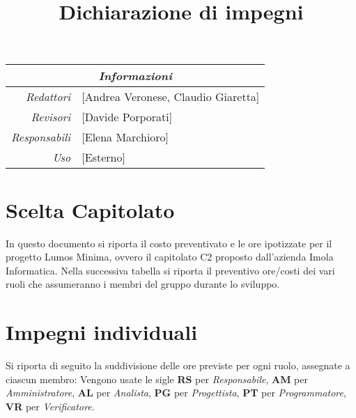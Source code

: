 \documentclass[12pt]{article}
\begin{document}
\graphicspath{ {../../templates/img/} }


\title{Dichiarazione di impegni}
\firstPage

\maketitle

\begin{center}
    \begin{tabular}{r | l}
		\multicolumn{2}{c}{\textit{Informazioni}}\\
		\hline
		
			\textit{Redattori} &
			[Andrea Veronese, Claudio Giaretta]\makecell{}\\

			\textit{Revisori} &
			[Davide Porporati]\makecell{}\\
			\textit{Responsabili} &
			[Elena Marchioro]\makecell{}\\
		      \textit{Uso} & 
                [Esterno]\makecell{}\\
    \end{tabular}
\end{center}


\tableofcontents
\printindex 
\section{Scelta Capitolato}
In questo documento si riporta il costo preventivato e le ore ipotizzate per il progetto Lumos Minima, ovvero il capitolato C2 proposto dall'azienda Imola Informatica.
Nella successiva tabella si riporta il preventivo ore/costi dei vari ruoli che assumeranno i membri del gruppo durante lo sviluppo.

\section{Impegni individuali}
Si riporta di seguito la suddivisione delle ore previste per ogni ruolo, assegnate a ciascun membro:
\smallskip
\noindent Vengono usate le sigle \textbf{RS} per \textit{Responsabile}, \textbf{AM} per \textit{Amministratore}, \textbf{AL} per \textit{Analista}, \textbf{PG} per \textit{Progettista}, \textbf{PT} per \textit{Programmatore}, \textbf{VR} per \textit{Verificatore}.
\end{document}
